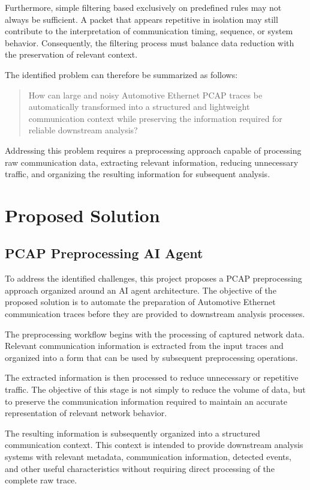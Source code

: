 Furthermore, simple filtering based exclusively on predefined rules may not always be sufficient. A packet that appears repetitive in isolation may still contribute to the interpretation of communication timing, sequence, or system behavior. Consequently, the filtering process must balance data reduction with the preservation of relevant context.

The identified problem can therefore be summarized as follows:

\begin{quote}
How can large and noisy Automotive Ethernet PCAP traces be automatically transformed into a structured and lightweight communication context while preserving the information required for reliable downstream analysis?
\end{quote}

Addressing this problem requires a preprocessing approach capable of processing raw communication data, extracting relevant information, reducing unnecessary traffic, and organizing the resulting information for subsequent analysis.

\section{Proposed Solution}

\subsection{PCAP Preprocessing AI Agent}

To address the identified challenges, this project proposes a PCAP preprocessing approach organized around an AI agent architecture. The objective of the proposed solution is to automate the preparation of Automotive Ethernet communication traces before they are provided to downstream analysis processes.

The preprocessing workflow begins with the processing of captured network data. Relevant communication information is extracted from the input traces and organized into a form that can be used by subsequent preprocessing operations.

The extracted information is then processed to reduce unnecessary or repetitive traffic. The objective of this stage is not simply to reduce the volume of data, but to preserve the communication information required to maintain an accurate representation of relevant network behavior.

The resulting information is subsequently organized into a structured communication context. This context is intended to provide downstream analysis systems with relevant metadata, communication information, detected events, and other useful characteristics without requiring direct processing of the complete raw trace.

